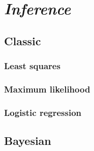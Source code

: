 \chapter{\emph{Inference}} 
\label{inference}


\section{Classic}
\subsection{Least squares}
\subsection{Maximum likelihood}
\subsection{Logistic regression}

\section{Bayesian}

